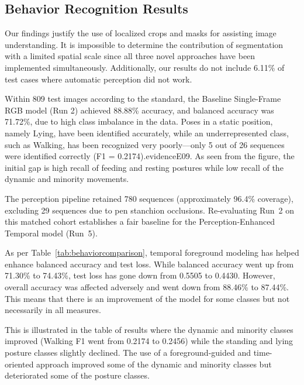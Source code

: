 \subsection{Behavior Recognition Results}

Our findings justify the use of localized crops and masks for assisting image understanding. It is impossible to determine the contribution of segmentation with a limited spatial scale since all three novel approaches have been implemented simultaneously. Additionally, our results do not include 6.11\% of test cases where automatic perception did not work.

Within 809 test images according to the standard, the Baseline Single-Frame RGB model (Run 2) achieved 88.88\% accuracy, and balanced accuracy was 71.72\%, due to high class imbalance in the data. Poses in a static position, namely Lying, have been identified accurately, while an underrepresented class, such as Walking, has been recognized very poorly---only 5 out of 26 sequences were identified correctly (F1 = 0.2174).evidenceE09. As seen from the figure, the initial gap is high recall of feeding and resting postures while low recall of the dynamic and minority movements.



The perception pipeline retained 780 sequences (approximately 96.4\% coverage), excluding 29 sequences due to pen stanchion occlusions. Re-evaluating Run~2 on this matched cohort establishes a fair baseline for the Perception-Enhanced Temporal model (Run~5).



As per Table~\ref{tab:behaviorcomparison}, temporal foreground modeling has helped enhance balanced accuracy and test loss. While balanced accuracy went up from 71.30\% to 74.43\%, test loss has gone down from 0.5505 to 0.4430. However, overall accuracy was affected adversely and went down from 88.46\% to 87.44\%. This means that there is an improvement of the model for some classes but not necessarily in all measures.



This is illustrated in the table of results where the dynamic and minority classes improved (Walking F1 went from 0.2174 to 0.2456) while the standing and lying posture classes slightly declined. The use of a foreground-guided and time-oriented approach improved some of the dynamic and minority classes but deteriorated some of the posture classes.

